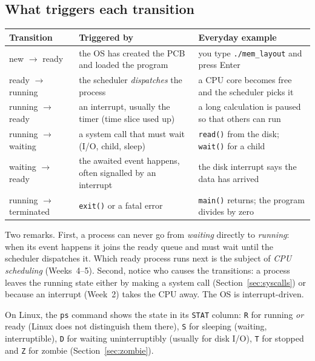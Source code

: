 \documentclass[11pt,a4paper]{article}
\newcommand{\cmd}[1]{\texttt{#1}}
\begin{document}
\subsection{What triggers each transition}

\begin{center}
\renewcommand{\arraystretch}{1.3}
\begin{tabularx}{\linewidth}{>{\raggedright\arraybackslash}p{3.2cm} >{\raggedright\arraybackslash}X >{\raggedright\arraybackslash}p{4.6cm}}
\toprule
\textbf{Transition} & \textbf{Triggered by} & \textbf{Everyday example} \\
\midrule
new $\to$ ready & the OS has created the PCB and loaded the program & you type \cmd{./mem\_layout} and press Enter \\
ready $\to$ running & the scheduler \emph{dispatches} the process & a CPU core becomes free and the scheduler picks it \\
running $\to$ ready & an interrupt, usually the timer (time slice used up) & a long calculation is paused so that others can run \\
running $\to$ waiting & a system call that must wait (I/O, child, sleep) & \cmd{read()} from the disk; \cmd{wait()} for a child \\
waiting $\to$ ready & the awaited event happens, often signalled by an interrupt & the disk interrupt says the data has arrived \\
running $\to$ terminated & \cmd{exit()} or a fatal error & \cmd{main()} returns; the program divides by zero \\
\bottomrule
\end{tabularx}
\end{center}

Two remarks. First, a process can never go from \emph{waiting} directly to \emph{running}: when its event happens it joins the ready queue and must wait until the scheduler dispatches it. Which ready process runs next is the subject of \emph{CPU scheduling} (Weeks~4--5). Second, notice who causes the transitions: a process leaves the running state either by making a system call (Section~\ref{sec:syscalls}) or because an interrupt (Week~2) takes the CPU away. The OS is interrupt-driven.

On Linux, the \cmd{ps} command shows the state in its \texttt{STAT} column: \texttt{R} for running \emph{or} ready (Linux does not distinguish them there), \texttt{S} for sleeping (waiting, interruptible), \texttt{D} for waiting uninterruptibly (usually for disk I/O), \texttt{T} for stopped and \texttt{Z} for zombie (Section~\ref{sec:zombie}).
\end{document}
